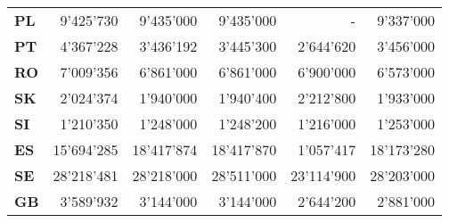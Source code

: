 \begin{tabular}{lrrrrr}
\textbf{PL     } &  9'425'730 &  9'435'000 &  9'435'000 &          - &  9'337'000 \\
\textbf{PT     } &  4'367'228 &  3'436'192 &  3'445'300 &  2'644'620 &  3'456'000 \\
\textbf{RO     } &  7'009'356 &  6'861'000 &  6'861'000 &  6'900'000 &  6'573'000 \\
\textbf{SK     } &  2'024'374 &  1'940'000 &  1'940'400 &  2'212'800 &  1'933'000 \\
\textbf{SI     } &  1'210'350 &  1'248'000 &  1'248'200 &  1'216'000 &  1'253'000 \\
\textbf{ES     } & 15'694'285 & 18'417'874 & 18'417'870 &  1'057'417 & 18'173'280 \\
\textbf{SE     } & 28'218'481 & 28'218'000 & 28'511'000 & 23'114'900 & 28'203'000 \\
\textbf{GB     } &  3'589'932 &  3'144'000 &  3'144'000 &  2'644'200 &  2'881'000 \\
\bottomrule
\end{tabular}
